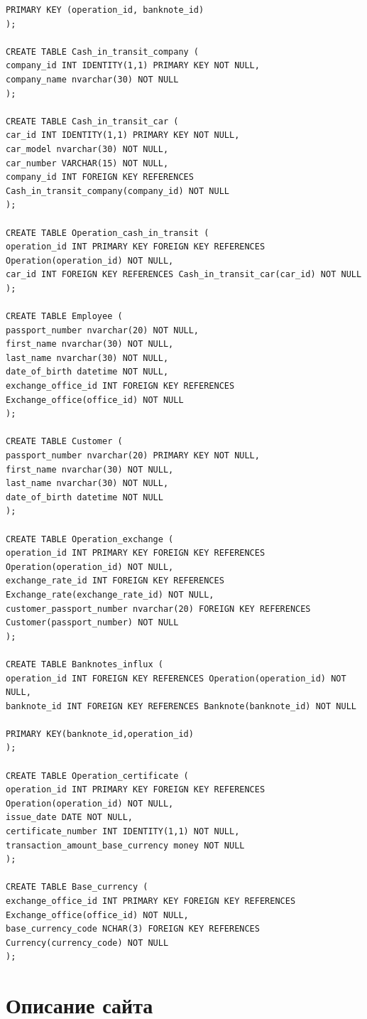 \documentclass{article}
\begin{document}
\begin{verbatim}
PRIMARY KEY (operation_id, banknote_id)
);
 
CREATE TABLE Cash_in_transit_company (
company_id INT IDENTITY(1,1) PRIMARY KEY NOT NULL,
company_name nvarchar(30) NOT NULL
);
 
CREATE TABLE Cash_in_transit_car (
car_id INT IDENTITY(1,1) PRIMARY KEY NOT NULL,
car_model nvarchar(30) NOT NULL,
car_number VARCHAR(15) NOT NULL,
company_id INT FOREIGN KEY REFERENCES Cash_in_transit_company(company_id) NOT NULL
);
 
CREATE TABLE Operation_cash_in_transit (
operation_id INT PRIMARY KEY FOREIGN KEY REFERENCES Operation(operation_id) NOT NULL,
car_id INT FOREIGN KEY REFERENCES Cash_in_transit_car(car_id) NOT NULL
);
 
CREATE TABLE Employee (
passport_number nvarchar(20) NOT NULL,
first_name nvarchar(30) NOT NULL,
last_name nvarchar(30) NOT NULL,
date_of_birth datetime NOT NULL,
exchange_office_id INT FOREIGN KEY REFERENCES Exchange_office(office_id) NOT NULL
);
 
CREATE TABLE Customer (
passport_number nvarchar(20) PRIMARY KEY NOT NULL,
first_name nvarchar(30) NOT NULL,
last_name nvarchar(30) NOT NULL,
date_of_birth datetime NOT NULL
);
 
CREATE TABLE Operation_exchange (
operation_id INT PRIMARY KEY FOREIGN KEY REFERENCES Operation(operation_id) NOT NULL,
exchange_rate_id INT FOREIGN KEY REFERENCES Exchange_rate(exchange_rate_id) NOT NULL,
customer_passport_number nvarchar(20) FOREIGN KEY REFERENCES Customer(passport_number) NOT NULL
);
 
CREATE TABLE Banknotes_influx (
operation_id INT FOREIGN KEY REFERENCES Operation(operation_id) NOT NULL,
banknote_id INT FOREIGN KEY REFERENCES Banknote(banknote_id) NOT NULL
 
PRIMARY KEY(banknote_id,operation_id)
);

CREATE TABLE Operation_certificate (
operation_id INT PRIMARY KEY FOREIGN KEY REFERENCES Operation(operation_id) NOT NULL,
issue_date DATE NOT NULL,
certificate_number INT IDENTITY(1,1) NOT NULL,
transaction_amount_base_currency money NOT NULL
);
 
CREATE TABLE Base_currency (
exchange_office_id INT PRIMARY KEY FOREIGN KEY REFERENCES Exchange_office(office_id) NOT NULL,
base_currency_code NCHAR(3) FOREIGN KEY REFERENCES Currency(currency_code) NOT NULL
);

\end{verbatim}
\section{Описание сайта}
\end{document}

